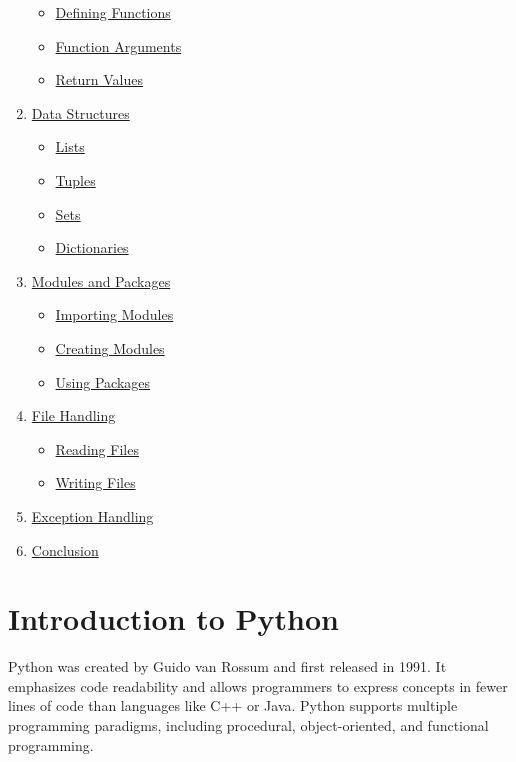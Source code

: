 \documentclass[
  letterpaper,
  DIV=11,
  numbers=noendperiod]{scrreprt}
\providecommand{\tightlist}{%
  \setlength{\itemsep}{0pt}\setlength{\parskip}{0pt}}\usepackage{longtable,booktabs,array}
\begin{document}
\begin{enumerate}
  \begin{itemize}
  \tightlist
  \item
    \hyperref[defining-functions]{Defining Functions}
  \item
    \hyperref[function-arguments]{Function Arguments}
  \item
    \hyperref[return-values]{Return Values}
  \end{itemize}
\item
  \hyperref[data-structures]{Data Structures}

  \begin{itemize}
  \tightlist
  \item
    \hyperref[lists]{Lists}
  \item
    \hyperref[tuples]{Tuples}
  \item
    \hyperref[sets]{Sets}
  \item
    \hyperref[dictionaries]{Dictionaries}
  \end{itemize}
\item
  \hyperref[modules-and-packages]{Modules and Packages}

  \begin{itemize}
  \tightlist
  \item
    \hyperref[importing-modules]{Importing Modules}
  \item
    \hyperref[creating-modules]{Creating Modules}
  \item
    \hyperref[using-packages]{Using Packages}
  \end{itemize}
\item
  \hyperref[file-handling]{File Handling}

  \begin{itemize}
  \tightlist
  \item
    \hyperref[reading-files]{Reading Files}
  \item
    \hyperref[writing-files]{Writing Files}
  \end{itemize}
\item
  \hyperref[exception-handling]{Exception Handling}
\item
  \hyperref[conclusion]{Conclusion}
\end{enumerate}

\section{Introduction to Python}\label{introduction-to-python}

Python was created by Guido van Rossum and first released in 1991. It
emphasizes code readability and allows programmers to express concepts
in fewer lines of code than languages like C++ or Java. Python supports
multiple programming paradigms, including procedural, object-oriented,
and functional programming.
\end{document}
